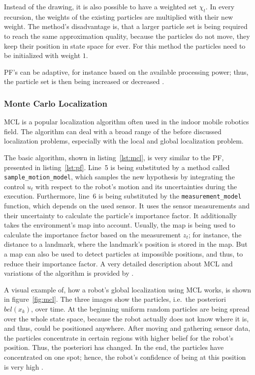 Instead of the drawing, it is also possible to have a weighted set $\chi_t$. In every recursion, the weights of the existing particles are multiplied with their new weight. The method's disadvantage is, that a larger particle set is being required to reach the same approximation quality, because the particles do not move, they keep their position in state space for ever. For this method the particles need to be initialized with weight $1$.
 
\acs{PF}'s can be adaptive, for instance based on the available processing power; thus, the particle set is then being increased or decreased \citep{thrun:prob_robo}.


\subsubsection*{Monte Carlo Localization}\label{sec:fund_mcl}
\ac{MCL} is a popular localization algorithm often used in the indoor mobile robotics field. The algorithm can deal with a broad range of the before discussed localization problems, especially with the local and global localization problem.

The basic algorithm, shown in listing~\ref{lst:mcl}, is very similar to the \acs{PF}, presented in listing~\ref{lst:pf}. Line~5 is being substituted by a method called \texttt{sample\_motion\_model}, which samples the new hypothesis by integrating the control $u_t$ with respect to the robot's motion and its uncertainties during the execution. Furthermore, line~6 is being substituted by the \texttt{measurement\_model} function, which depends on the used sensor. It uses the sensor measurements and their uncertainty to calculate the particle's importance factor. It additionally takes the environment's map into account. Usually, the map is being used to calculate the importance factor based on the measurement $z_t$; for instance, the distance to a landmark, where the landmark's position is stored in the map. But a map can also be used to detect particles at impossible positions, and thus, to reduce their importance factor. A very detailed description about \acl{MCL} and variations of the algorithm is provided by \citet{thrun:prob_robo}.

A visual example of, how a robot's global localization using \acs{MCL} works, is shown in figure~\ref{fig:mcl}. The three images show the particles, i.e.\ the posteriori $bel(x_k)$, over time. At the beginning uniform random particles are being spread over the whole state space, because the robot actually does not know where it is, and thus, could be positioned anywhere. After moving and gathering sensor data, the particles concentrate in certain regions with higher belief for the robot's position. Thus, the posteriori has changed. In the end, the particles have concentrated on one spot; hence, the robot's confidence of being at this position is very high \citep{thrun:prob_robo}.

